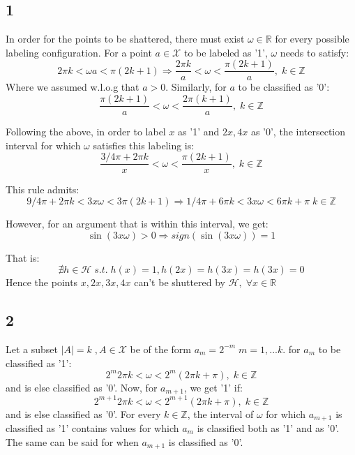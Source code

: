 \subsection*{1}
In order for the points to be shattered, there must exist $\omega \in \mathbb{R}$ for every possible labeling configuration.
For a point $a \in \mathcal{X}$ to be labeled as '1', $\omega$ needs to satisfy:
\begin{equation*}
    2 \pi k < \omega a < \pi (2k + 1) \Rightarrow \frac{2 \pi k}{a} < \omega < \frac{\pi (2k + 1)}{a},  \; k\in \mathbb{Z}
\end{equation*}
Where we assumed w.l.o.g that $a>0$. Similarly, for $a$ to be classified as '0':
\begin{equation*}
    \frac{\pi(2k+1)}{a} < \omega < \frac{2\pi(k + 1)}{a},  \; k\in \mathbb{Z}
\end{equation*}

Following the above, in order to label $x$ as '1' and $2x, 4x$ as '0', the intersection interval for which $\omega$ satisfies this labeling is:
\begin{equation*}
    \frac{3/4 \pi + 2 \pi k}{x} < \omega < \frac{\pi (2k + 1)}{x},  \; k\in \mathbb{Z}
\end{equation*}

This rule admits:
\begin{equation*}
    9/4 \pi + 2 \pi k < 3x \omega  < 3\pi (2k + 1) \Rightarrow
    1/4 \pi + 6 \pi k < 3x \omega  < 6\pi k + \pi \; k\in \mathbb{Z}
\end{equation*}

However, for an argument that is within this interval, we get:
\begin{equation*}
    \sin(3x\omega) > 0 \Rightarrow sign(\sin(3x\omega)) = 1
\end{equation*}

That is:
\begin{equation*}
    \nexists h\in \mathcal{H} \; s.t. \; h(x)=1, h(2x)=h(3x)=h(3x)=0
\end{equation*}
Hence the points $x, 2x, 3x, 4x$ can't be shuttered by $\mathcal{H}, \; \forall x\in \mathbb{R}$

\subsection*{2}
Let a subset $|A|=k \;, A\in \mathcal{X}$ be of the form $a_m = 2^{-m} \; m=1,...k$.
for $a_m$ to be classified as '1':
\begin{equation*}
   2^m 2\pi k < \omega < 2^m (2\pi k + \pi),  \; k\in \mathbb{Z}
\end{equation*}
and is else classified as '0'. Now, for $a_{m+1}$, we get '1' if:
\begin{equation*}
    2^{m+1} 2\pi k < \omega < 2^{m+1} (2\pi k + \pi),  \; k\in \mathbb{Z}
 \end{equation*}
and is else classified as '0'. For every $k\in \mathbb{Z}$, the interval of $\omega$ for which $a_{m+1}$ is classified as '1' contains values for which $a_m$ is classified both as '1' and as '0'. The same can be said for when $a_{m+1}$ is classified as '0'.

